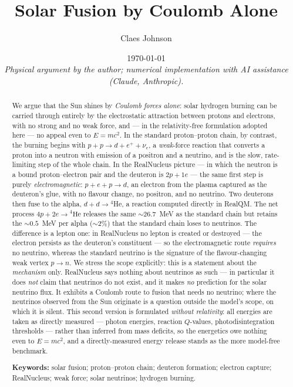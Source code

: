 \documentclass[11pt]{article}
\title{Solar Fusion by Coulomb Alone}
\author[1]{Claes Johnson}
\affil[1]{KTH Royal Institute of Technology, SE-100 44 Stockholm, Sweden \\
\texttt{claesjohnson@gmail.com}}
\date{\today \\[0.4em]
\small\textit{Physical argument by the author; numerical implementation with AI assistance (Claude, Anthropic).}}
\begin{document}
\maketitle

\begin{abstract}
We argue that the Sun shines by \emph{Coulomb forces alone}: solar hydrogen burning can be carried
through entirely by the electrostatic attraction between protons and electrons, with no strong and no
weak force, and --- in the relativity-free formulation adopted here --- no appeal even to $E=mc^2$. In
the standard proton--proton chain, by contrast, the burning begins with $p+p\to d+e^{+}+\nu_e$, a
\emph{weak}-force reaction that converts a proton into a neutron with emission of a positron and a
neutrino, and is the slow, rate-limiting step of the whole chain. In the RealNucleus picture --- in
which the neutron is a bound proton--electron pair and the deuteron is $2p+1e$ --- the same first step
is purely \emph{electromagnetic}: $p+e+p\to d$, an electron from the plasma captured as the deuteron's
glue, with no flavour change, no positron, and no neutrino. Two deuterons then fuse to the alpha,
$d+d\to{}^4$He, a reaction computed directly in RealQM. The net process $4p+2e\to{}^4\mathrm{He}$
releases the same ${\sim}26.7$~MeV as the standard chain but retains the ${\sim}0.5$~MeV per alpha
(${\sim}2\%$) that the standard chain loses to neutrinos. The difference is a lepton one: in RealNucleus
no lepton is created or destroyed --- the electron persists as the deuteron's constituent --- so the
electromagnetic route \emph{requires} no neutrino, whereas the standard neutrino is the signature of the
flavour-changing weak vertex $p\to n$. We stress the scope explicitly: this is a statement about the
\emph{mechanism} only. RealNucleus says nothing about neutrinos as such --- in particular it does
\emph{not} claim that neutrinos do not exist, and it makes \emph{no} prediction for the solar neutrino
flux. It exhibits a Coulomb route to fusion that needs no neutrino; where the neutrinos observed from
the Sun originate is a question outside the model's scope, on which it is silent. This second version is formulated \emph{without relativity}: all energies are taken as
directly measured --- photon energies, reaction $Q$-values, photodisintegration thresholds --- rather
than inferred from mass deficits, so the energetics owe nothing even to $E=mc^2$, and a directly-measured
energy release stands as the more model-free benchmark.

\medskip
\noindent\textbf{Keywords:} solar fusion; proton--proton chain; deuteron formation; electron capture;
RealNucleus; weak force; solar neutrinos; hydrogen burning.
\end{abstract}
\end{document}
